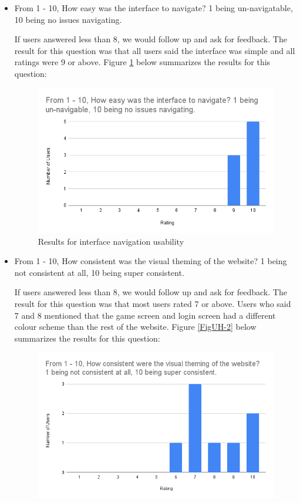 \documentclass[12pt, titlepage]{article}
\begin{document}
\begin{itemize}
    \item From 1 - 10, How easy was the interface to navigate? 
    1 being un-navigatable, 10 being no issues navigating.

    If users answered less than 8, we would follow up and ask for feedback. The result for this question was that all users said the interface was simple and all ratings were 9 or above. Figure \ref{FigUH-1} below summarizes the results for this question:

    \begin{figure}[H]
    \centering
    \includegraphics[width=1\textwidth]{question1chart.png}
    
    \caption{Results for interface navigation usability}
    
    \label{FigUH-1}
    \end{figure}

    \item From 1 - 10, How consistent was the visual theming of the website? 1 being not consistent at all, 10 being super consistent. 

    If users answered less than 8, we would follow up and ask for feedback. The result for this question was that most users rated 7 or above. Users who said 7 and 8 mentioned that the game screen and login screen had a different colour scheme than the rest of the website. Figure \ref{FigUH-2} below summarizes the results for this question:

    \begin{figure}[H]
    \centering
    \includegraphics[width=1\textwidth]{question2chart.png}
    

\end{figure}
\end{itemize}
\end{document}
